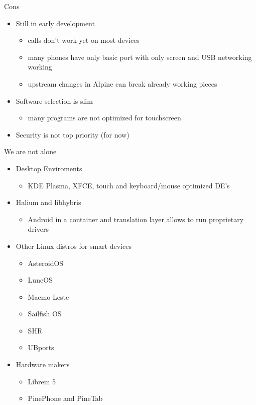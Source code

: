 \documentclass[aspectratio=169]{beamer}
\begin{document}
\begin{frame}{Cons}
\begin{itemize}
	\item Still in early development
	\begin{itemize}
		\item calls don't work yet on most devices
		\item many phones have only basic port with only screen and USB networking working 
		\item upstream changes in Alpine can break already working pieces
	\end{itemize}
	\item Software selection is slim
	\begin{itemize}
		\item many programs are not optimized for touchscreen
	\end{itemize}
	\item Security is not top priority (for now)
\end{itemize}
\end{frame}

\begin{frame}{We are not alone}
\begin{itemize}
	\item Desktop Enviroments
	\begin{itemize}
	\item KDE Plasma, XFCE, touch and keyboard/mouse optimized DE's
	\end{itemize}
	\item Halium and libhybris
	\begin{itemize}
		\item Android in a container and translation layer allows to run proprietary drivers
	\end{itemize}
	\item Other Linux distros for smart devices
	\begin{itemize}
	\item AsteroidOS
	\item LuneOS
	\item Maemo Leste
	\item Sailfish OS
	\item SHR
	\item UBports
	\end{itemize}
	\item Hardware makers
	\begin{itemize}
		\item Librem 5
		\item PinePhone and PineTab
	\end{itemize}
\end{itemize}
\end{frame}
\end{document}
